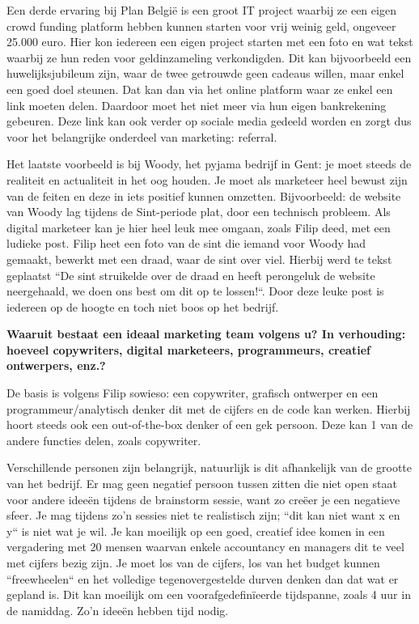	Een derde ervaring bij Plan België is een groot IT project waarbij ze een eigen crowd funding platform hebben kunnen starten voor vrij weinig geld, ongeveer 25.000 euro. Hier kon iedereen een eigen project starten met een foto en wat tekst waarbij ze hun reden voor geldinzameling verkondigden. Dit kan bijvoorbeeld een huwelijksjubileum zijn, waar de twee getrouwde geen cadeaus willen, maar enkel een goed doel steunen. Dat kan dan via het online platform waar ze enkel een link moeten delen. Daardoor moet het niet meer via hun eigen bankrekening gebeuren. Deze link kan ook verder op sociale media gedeeld worden en zorgt dus voor het belangrijke onderdeel van marketing: referral.
	
	Het laatste voorbeeld is bij Woody, het pyjama bedrijf in Gent: je moet steeds de realiteit en actualiteit in het oog houden. Je moet als marketeer heel bewust zijn van de feiten en deze in iets positief kunnen omzetten. Bijvoorbeeld: de website van Woody lag tijdens de Sint-periode plat, door een technisch probleem. Als digital marketeer kan je hier heel leuk mee omgaan, zoals Filip deed, met een ludieke post. Filip heet een foto van de sint die iemand voor Woody had gemaakt, bewerkt met een draad, waar de sint over viel. Hierbij werd te tekst geplaatst ``De sint struikelde over de draad en heeft perongeluk de website neergehaald, we doen ons best om dit op te lossen!``. Door deze leuke post is iedereen op de hoogte en toch niet boos op het bedrijf.
	
\textbf{Waaruit bestaat een ideaal marketing team volgens u? In verhouding: hoeveel copywriters, digital marketeers, programmeurs, creatief ontwerpers, enz.?}
	
	De basis is volgens Filip sowieso: een copywriter, grafisch ontwerper en een programmeur/analytisch denker dit met de cijfers en de code kan werken. Hierbij hoort steeds ook een out-of-the-box denker of een gek persoon. Deze kan 1 van de andere functies delen, zoals copywriter.	
	
	Verschillende personen zijn belangrijk, natuurlijk is dit afhankelijk van de grootte van het bedrijf. Er mag geen negatief persoon tussen zitten die niet open staat voor andere ideeën tijdens de brainstorm sessie, want zo creëer je een negatieve sfeer. Je mag tijdens zo'n sessies niet te realistisch zijn; ``dit kan niet want x en y`` is niet wat je wil. Je kan moeilijk op een goed, creatief idee komen in een vergadering met 20 mensen waarvan enkele accountancy en managers dit te veel met cijfers bezig zijn. Je moet los van de cijfers, los van het budget kunnen ``freewheelen`` en het volledige tegenovergestelde durven denken dan dat wat er gepland is. Dit kan moeilijk om een voorafgedefinïeerde tijdspanne, zoals 4 uur in de namiddag. Zo'n ideeën hebben tijd nodig.
	
